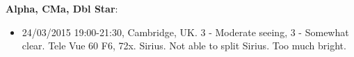 {\bf Alpha, CMa, Dbl Star}:
\begin{itemize}
\item 24/03/2015 19:00-21:30, Cambridge, UK. 3 - Moderate seeing, 3 - Somewhat clear. Tele Vue 60 F6, 72x. Sirius. Not able to split Sirius. Too much bright.
\end{itemize}

